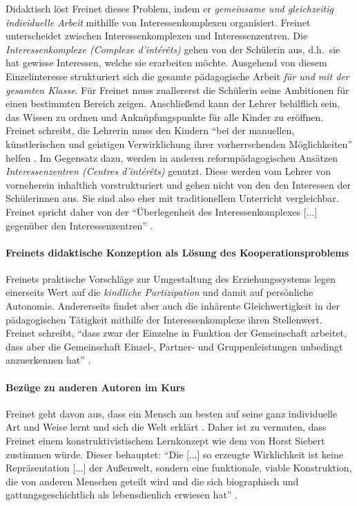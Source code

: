 Didaktisch löst Freinet dieses Problem, indem er \emph{gemeinsame und gleichzeitig individuelle Arbeit} mithilfe von Interessenkomplexen organisiert.
Freinet unterscheidet zwischen Interessenkomplexen und Interessenzentren.
Die \emph{Interessenkomplexe (Complexe d'intérêts)} gehen von der Schülerin aus, d.h.\ sie hat gewisse Interessen, welche sie erarbeiten möchte.
Ausgehend von diesem Einzelinteresse strukturiert sich die gesamte pädagogische Arbeit \emph{für und mit der gesamten Klasse}.
Für Freinet muss zuallererst die Schülerin seine Ambitionen für einen bestimmten Bereich zeigen.
Anschließend kann der Lehrer behilflich sein, das Wissen zu ordnen und Anknüpfungspunkte für alle Kinder zu eröffnen.
Freinet schreibt, die Lehrerin muss den Kindern ``bei der manuellen, künstlerischen und geistigen Verwirklichung ihrer vorherrschenden Möglichkeiten'' helfen \parencite[90]{Freinet1979}.
Im Gegensatz dazu, werden in anderen reformpädagogischen Ansätzen \emph{Interessenzentren (Centres d'intérêts)} genutzt.
Diese werden vom Lehrer von vorneherein inhaltlich vorstrukturiert und gehen nicht von den den Interessen der Schülerinnen aus.
Sie sind also eher mit traditionellem Unterricht vergleichbar.
Freinet spricht daher von der ``Überlegenheit des Interessenkomplexes [...] gegenüber den Interessenzentren'' \parencite[89]{Freinet1979}.


\paragraph{Freinets didaktische Konzeption als Lösung des Kooperationsproblems}

Freinets praktische Vorschläge zur Umgestaltung des Erziehungssystems legen einerseits Wert auf die \emph{kindliche Partizipation} und damit auf persönliche Autonomie.
Andererseits findet aber auch die inhärente Gleichwertigkeit in der pädagogischen Tätigkeit mithilfe der Interessenkomplexe ihren Stellenwert.
Freinet schreibt, ``dass zwar der Einzelne in Funktion der Gemeinschaft arbeitet, dass aber die Gemeinschaft Einzel-, Partner- und Gruppenleistungen unbedingt anzuerkennen hat'' \parencite[87]{Freinet1979}.


\paragraph{Bezüge zu anderen Autoren im Kurs}

Freinet geht davon aus, dass ein Mensch am besten auf seine ganz individuelle Art und Weise lernt und sich die Welt erklärt \parencite[vgl.][96]{Freinet-2000a}.
Daher ist zu vermuten, dass Freinet einem konstruktivistischem Lernkonzept wie dem von Horst Siebert zustimmen würde.
Dieser behauptet: ``Die [...] so erzeugte Wirklichkeit ist keine Repräsentation [...] der Außenwelt, sondern eine funktionale, viable Konstruktion, die von anderen Menschen geteilt wird und die sich biographisch und gattungsgeschichtlich als lebensdienlich erwiesen hat'' \parencite[6]{siebert-2003}.

